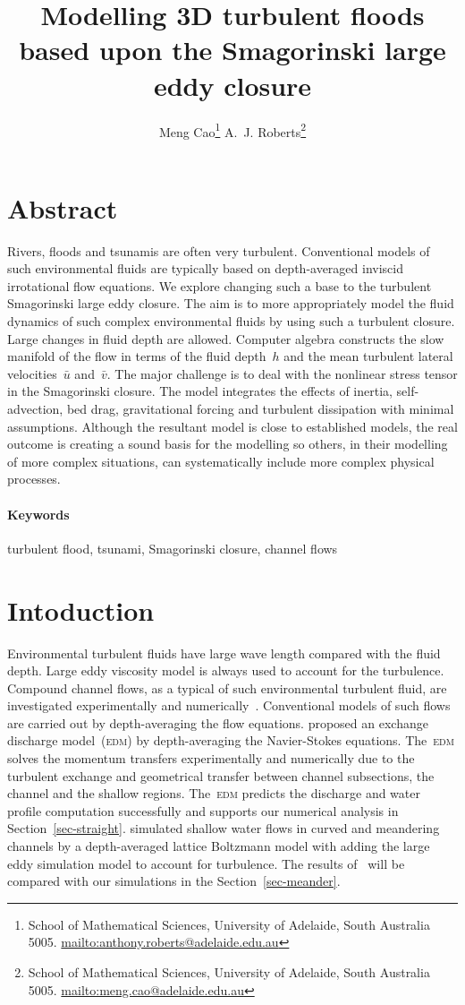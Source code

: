 \documentclass[12pt,a5paper]{article}
\title{Modelling 3D turbulent floods based upon the Smagorinski large eddy closure}
\author{Meng Cao\thanks{School of Mathematical Sciences,
University of Adelaide, South Australia 5005.  \protect\url{mailto:anthony.roberts@adelaide.edu.au}}
\qquad 
A.~J. Roberts\thanks{School of Mathematical Sciences,
University of Adelaide, South Australia 5005.  \protect\url{mailto:meng.cao@adelaide.edu.au}}}
\begin{document}
    
\maketitle

\section*{Abstract}

Rivers, floods and tsunamis are often very turbulent. Conventional models of such environmental fluids are typically based on depth-averaged inviscid irrotational flow equations. We explore changing such a base to the turbulent Smagorinski large eddy closure. The aim is to more appropriately model the fluid dynamics of such complex environmental fluids by using such a turbulent closure. Large changes in fluid depth are allowed. Computer algebra constructs the slow manifold of the flow in terms of the fluid depth~$h$ and the mean turbulent lateral velocities~$\bar u$ and~$\bar v$. The major challenge is to deal with the nonlinear stress tensor in the Smagorinski closure. The model integrates the effects of inertia, self-advection, bed drag, gravitational forcing and turbulent dissipation with minimal assumptions. Although the resultant model is close to established models, the real outcome is creating a sound basis for the modelling so others, in their modelling of more complex situations, can systematically include more complex physical processes.

\paragraph{Keywords} turbulent flood, tsunami, Smagorinski closure, channel flows

\tableofcontents

\section{Intoduction}

Environmental turbulent fluids have large wave length compared with the fluid depth. Large eddy viscosity model is always used to account for the turbulence. Compound channel flows, as a typical of such environmental turbulent fluid, are investigated experimentally and numerically~\cite[e.g.]{Bousmar2002,Liu2009,Demuren1993}. Conventional models of such flows are carried out by depth-averaging the flow equations. \cite{Bousmar2002} proposed an exchange discharge model~(\textsc{edm}) by depth-averaging the Navier-Stokes equations. The~\textsc{edm} solves the momentum transfers experimentally and numerically due to the turbulent exchange and geometrical transfer between channel subsections, the channel and the shallow regions. The~\textsc{edm} predicts the discharge and water profile computation successfully and supports our numerical analysis in Section~\ref{sec-straight}. \cite{Liu2009} simulated shallow water flows in curved and meandering channels by a depth-averaged lattice Boltzmann model with adding the large eddy simulation model to account for turbulence. The results of~\cite{Liu2009} will be compared with our simulations in the Section~\ref{sec-meander}. 
\end{document}
